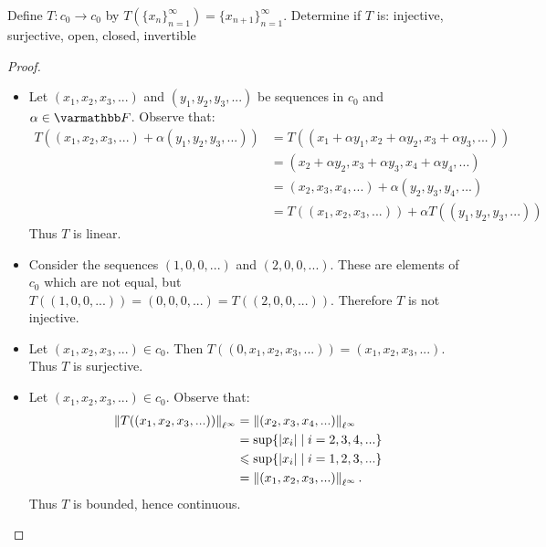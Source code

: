 \begin{exercise}
Define $T:c_0 \rightarrow c_0$ by $T(\{x_n\}_{n = 1}^\infty) = \{x_{n+1}\}_{n = 1}^\infty$. Determine if $T$ is: injective, surjective, open, closed, invertible
\end{exercise}
    \begin{proof}
        \phantom{a}
        \begin{itemize}[itemsep=1pt,topsep=3pt]
            \item  Let $(x_1,x_2,x_3,...)$ and $(y_1,y_2,y_3,...)$ be sequences in $c_0$ and $\alpha \in \bfF$. Observe that:
            \begin{equation*}
            \begin{split}
                T((x_1,x_2,x_3,...) + \alpha (y_1,y_2,y_3,...))
                & = T((x_1 + \alpha y_1, x_2 + \alpha y_2, x_3 + \alpha y_3,...)) \\
                & = (x_2 + \alpha y_2, x_3 + \alpha y_3, x_4 + \alpha y_4,...) \\
                & = (x_2,x_3,x_4,...) + \alpha (y_2,y_3,y_4,...) \\
                & = T((x_1,x_2,x_3,...)) + \alpha T((y_1,y_2,y_3,...))
            \end{split}
            \end{equation*}
        Thus $T$ is linear.

        \item Consider the sequences $(1,0,0,...)$ and $(2,0,0,...)$. These are elements of $c_0$ which are not equal, but $T((1,0,0,...)) = (0,0,0,...) = T((2,0,0,...))$. Therefore $T$ is not injective.
        
        \item Let $(x_1,x_2,x_3,...) \in c_0$. Then $T((0,x_1,x_2,x_3,...)) = (x_1,x_2,x_3,...)$. Thus $T$ is surjective.
        
        \item Let $(x_1,x_2,x_3,...) \in c_0$. Observe that:
            \begin{equation*}
            \begin{split}
                \left\lVert T((x_1,x_2,x_3,...)) \right\rVert_{\ell^\infty} 
                & = \left\lVert (x_2,x_3,x_4,...) \right\rVert_{\ell^\infty} \\
                & = \sup \{|x_i| \mid i = 2,3,4,...\} \\
                & \leqslant \sup \{|x_i| \mid i = 1,2,3,...\} \\
                & = \left\lVert (x_1,x_2,x_3,...) \right\rVert_{\ell^\infty}.
            \end{split}
            \end{equation*}
        Thus $T$ is bounded, hence continuous.


\end{itemize}
\end{proof}
